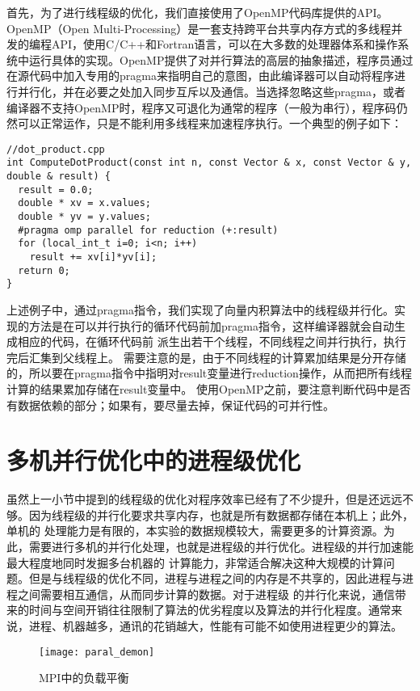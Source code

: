 首先，为了进行线程级的优化，我们直接使用了OpenMP代码库提供的API。OpenMP（Open Multi-Processing）是一套支持跨平台共享内存方式的多线程并发的编程API，使用C/C++和Fortran语言，可以在大多数的处理器体系和操作系统中运行具体的实现。OpenMP提供了对并行算法的高层的抽象描述，程序员通过在源代码中加入专用的pragma来指明自己的意图，由此编译器可以自动将程序进行并行化，并在必要之处加入同步互斥以及通信。当选择忽略这些pragma，或者编译器不支持OpenMP时，程序又可退化为通常的程序（一般为串行），程序码仍然可以正常运作，只是不能利用多线程来加速程序执行。一个典型的例子如下：
\begin{lstlisting}
//dot_product.cpp
int ComputeDotProduct(const int n, const Vector & x, const Vector & y, double & result) {
  result = 0.0;
  double * xv = x.values;
  double * yv = y.values;
  #pragma omp parallel for reduction (+:result)
  for (local_int_t i=0; i<n; i++)
    result += xv[i]*yv[i];
  return 0;
}
\end{lstlisting}

上述例子中，通过pragma指令，我们实现了向量内积算法中的线程级并行化。实现的方法是在可以并行执行的循环代码前加pragma指令，这样编译器就会自动生成相应的代码，在循环代码前
派生出若干个线程，不同线程之间并行执行，执行完后汇集到父线程上。
需要注意的是，由于不同线程的计算累加结果是分开存储的，所以要在pragma指令中指明对result变量进行reduction操作，从而把所有线程计算的结果累加存储在result变量中。
使用OpenMP之前，要注意判断代码中是否有数据依赖的部分；如果有，要尽量去掉，保证代码的可并行性。

\section{多机并行优化中的进程级优化}

虽然上一小节中提到的线程级的优化对程序效率已经有了不少提升，但是还远远不够。因为线程级的并行化要求共享内存，也就是所有数据都存储在本机上；此外，单机的
处理能力是有限的，本实验的数据规模较大，需要更多的计算资源。为此，需要进行多机的并行化处理，也就是进程级的并行优化。进程级的并行加速能最大程度地同时发掘多台机器的
计算能力，非常适合解决这种大规模的计算问题。但是与线程级的优化不同，进程与进程之间的内存是不共享的，因此进程与进程之间需要相互通信，从而同步计算的数据。对于进程级
的并行化来说，通信带来的时间与空间开销往往限制了算法的优劣程度以及算法的并行化程度。通常来说，进程、机器越多，通讯的花销越大，性能有可能不如使用进程更少的算法。
\begin{figure}[H]
  \centering
  \texttt{[image: paral\_demon]}
  \caption{MPI中的负载平衡}
  \label{fig:figparaldemon}
\end{figure}

